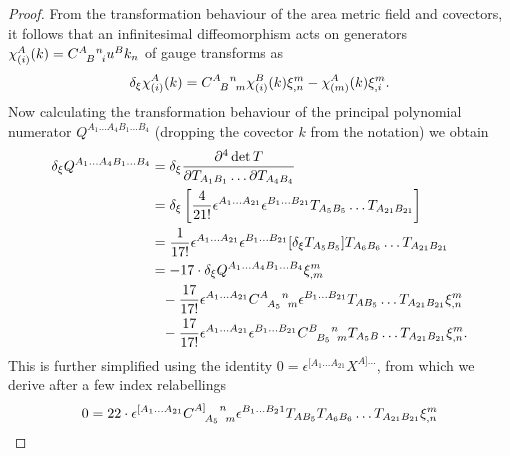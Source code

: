 \begin{proof}
  From the transformation behaviour of the area metric field and covectors, it follows that an infinitesimal diffeomorphism acts on generators $\chi^A_{(i)}(k) = \gmc{A}{B}{n}{i} u^B k_n$ of gauge transforms as
  \begin{equation}
    \delta_\xi \chi^A_{(i)}(k) = \gmc{A}{B}{n}{m} \chi^B_{(i)}(k) \xi^m_{,n} - \chi^A_{(m)}(k)\xi^m_{,i}.
  \end{equation}
  Now calculating the transformation behaviour of the principal polynomial numerator $Q^{A_1\dots A_4B_1\dots B_4}$ (dropping the covector $k$ from the notation) we obtain
  \begin{equation}\label{Q_trafo}
    \begin{aligned}
      \delta_\xi Q^{A_1\dots A_4B_1\dots B_4} &{} = \delta_\xi \frac{\partial^4 \operatorname{det} T}{\partial T_{A_1B_1}\dots\partial T_{A_4B_4}} \\
                                                  &{} = \delta_\xi \left\lbrack \frac{4}{21!} \epsilon^{A_1\dots A_{21}} \epsilon^{B_1\dots B_{21}} T_{A_5B_5} \dots T_{A_{21}B_{21}}\right\rbrack \\
                                                  &{} = \frac{1}{17!} \epsilon^{A_1\dots A_{21}} \epsilon^{B_1\dots B_{21}} \lbrack\delta_\xi T_{A_5B_5}\rbrack T_{A_6B_6}\dots T_{A_{21}B_{21}} \\
                                                  &{} = -17\cdot \delta_\xi Q^{A_1\dots A_4B_1\dots B_4} \xi^m_{,m} \\
                                                  &{} \hphantom{=} -\frac{17}{17!} \epsilon^{A_1\dots A_{21}} \gmc{A}{A_5}{n}{m} \epsilon^{B_1\dots B_{21}} T_{AB_5} \dots T_{A_{21}B_{21}} \xi^m_{,n} \\
                                                  &{} \hphantom{=} -\frac{17}{17!} \epsilon^{A_1\dots A_{21}} \epsilon^{B_1\dots B_{21}} \gmc{B}{B_5}{n}{m} T_{A_5B} \dots T_{A_{21}B_{21}} \xi^m_{,n}.
    \end{aligned}
  \end{equation}
  This is further simplified using the identity $0 = \epsilon^{\lbrack A_1\dots A_{21}} X^{A\rbrack\dots}$, from which we derive after a few index relabellings
  \begin{equation}
    \begin{aligned}
      0 &{} = 22 \cdot \epsilon^{\lbrack A_1\dots A_{21}} \gmc{A\rbrack}{A_5}{n}{m} \epsilon^{B_1\dots B_21} T_{AB_5}T_{A_6B_6}\dots T_{A_{21}B_{21}} \xi^m_{,n} \\

\end{aligned}
\end{equation}
\end{proof}
